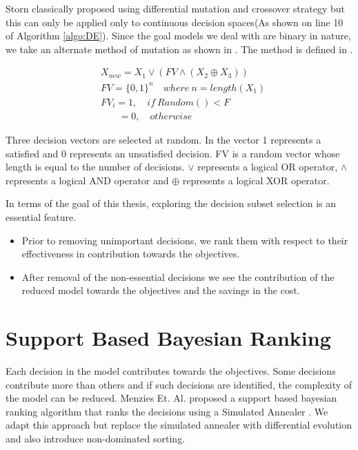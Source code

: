 Storn classically proposed using differential mutation and crossover strategy \cite{storn96} but this can only be applied only to continuous decision spaces(As shown on line 10 of Algorithm \ref{algo:DE}). Since the goal models we deal with are binary in nature, we take an alternate method of mutation as shown in \cite{falco07}. The method is defined in .

\begin{equation}
    \begin{aligned}
        & X_{new} = X_1 \lor (FV \land (X_2 \oplus X_3))\\
        & FV = \{0, 1\}^n \quad where\ n = length(X_{1}) \\
        & FV_i = 1,\quad if\ Random() < F \\
        & \quad \ \ \ \, = 0,\quad otherwise 
    \end{aligned}
    \label{eq:DE:binary}
\end{equation}

Three decision vectors are selected at random. In the vector 1 represents a satisfied and 0 represents an unsatisfied decision. FV is a random vector whose length is equal to the number of decisions. $\lor$ represents a logical OR operator, $\land$ represents a logical AND operator and $\oplus$ represents a logical XOR operator.

\bigskip

\noindent
In terms of the goal of this thesis, exploring the decision subset selection is an essential feature.

\begin{itemize}
    \item Prior to removing unimportant decisions, we rank them with respect to their effectiveness in contribution towards the objectives.
    \item After removal of the non-essential decisions we see the contribution of the reduced model towards the objectives and the savings in the cost. 
\end{itemize}

\section{Support Based Bayesian Ranking}
\label{sec:sa:bayes}

Each decision in the model contributes towards the objectives. Some decisions contribute more than others and if such decisions are identified, the complexity of the model can be reduced. Menzies Et. Al. proposed a support based bayesian ranking algorithm \cite{menzies07} that ranks the decisions using a Simulated Annealer \cite{kirkpatrick83}. We adapt this approach but replace the simulated annealer with differential evolution and also introduce non-dominated sorting.

